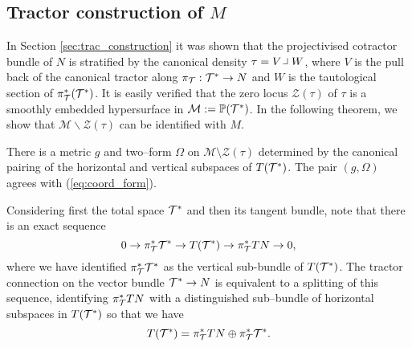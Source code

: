 \subsection{Tractor construction of $M$}\label{sec:trac_construction_g}

In Section \ref{sec:trac_construction} it was shown that the projectivised cotractor bundle of $N$ is stratified by the canonical density $\tau=V\hook W$, where $V$ is the pull back of the canonical tractor along $\pi_{\mathcal{T}}:\mathcal{T}^*\rightarrow N$ and $W$ is the tautological section of $\pi_{\mathcal{T}}^*(\mathcal{T}^*)$. It is easily verified that the zero locus $\mathcal{Z}(\tau)$ of $\tau$ is a smoothly embedded hypersurface in $\mathcal{M}:=\mathbb{P}(\mathcal{T}^*)$. %
In the following theorem, we show that $\mathcal{M}\backslash\mathcal{Z}(\tau)$ can be identified with $M$.

\begin{theo}\cite{DGW}\label{metric} 
There is a metric $g$ and two--form $\Omega$ on $\mathcal{M}\setminus \mathcal{Z}(\tau)$ determined by the canonical pairing of the horizontal and vertical subspaces of $T(\mathcal{T}^*)$. The pair $(g,\Omega)$ agrees with (\ref{eq:coord_form}).
\end{theo}
 Considering first the total space $\mathcal{T}^*$ and then its tangent
 bundle, note that there is an exact sequence
  \begin{equation}\label{TM}
0\to \pi_{\mathcal{T}}^* \mathcal{T}^*\to T(\mathcal{T}^*)\to \pi_{\mathcal{T}}^*TN\to 0,
  \end{equation}
  where we have identified $\pi_{\mathcal{T}}^* \mathcal{T}^*$ as the vertical sub-bundle of $T(\mathcal{T}^*)$.
The tractor connection on the vector bundle $\mathcal{T}^*\to N$ is equivalent to a splitting of this sequence, identifying $\pi_{\mathcal{T}}^*TN$ with a distinguished  sub--bundle of horizontal subspaces in 
$ T(\mathcal{T}^*)$ so that we have 
\begin{equation}\label{HV}
T(\mathcal{T}^*)=  \pi_{\mathcal{T}}^*TN\oplus \pi_{\mathcal{T}}^* \mathcal{T}^* .
\end{equation}

